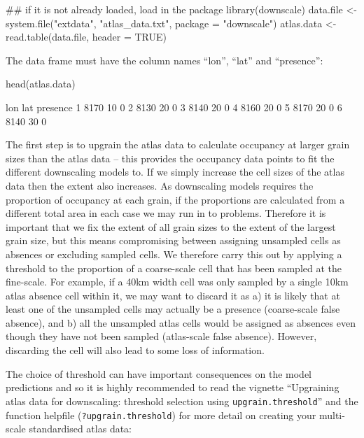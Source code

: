 \documentclass{article}[12pt, a4paper]
\begin{document}
\begin{Schunk}
\begin{Sinput}
## if it is not already loaded, load in the package
library(downscale)
data.file <- system.file("extdata", "atlas_data.txt", package = "downscale")
atlas.data <- read.table(data.file, header = TRUE)
\end{Sinput}
\end{Schunk}

The data frame must have the column names “lon”, “lat” and “presence”:

\begin{Schunk}
\begin{Sinput}
head(atlas.data)
\end{Sinput}
\begin{Soutput}
   lon lat presence
1 8170  10        0
2 8130  20        0
3 8140  20        0
4 8160  20        0
5 8170  20        0
6 8140  30        0
\end{Soutput}
\end{Schunk}

The first step is to upgrain the atlas data to calculate occupancy at larger grain sizes than the atlas data – this provides the occupancy data points to fit the different downscaling models to. If we simply increase the cell sizes of the atlas data then the extent also increases. As downscaling models requires the proportion of occupancy at each grain, if the proportions are calculated from a different total area in each case we may run in to problems. Therefore it is important that we fix the extent of all grain sizes to the extent of the largest grain size, but this means compromising between assigning unsampled cells as absences or excluding sampled cells. We therefore carry this out by applying a threshold to the proportion of a coarse-scale cell that has been sampled at the fine-scale. For example, if a 40km width cell was only sampled by a single 10km atlas absence cell within it, we may want to discard it as a) it is likely that at least one of the unsampled cells may actually be a presence (coarse-scale false absence), and b) all the unsampled atlas cells would be assigned as absences even though they have not been sampled (atlas-scale false absence). However, discarding the cell will also lead to some loss of information.

The choice of threshold can have important consequences on the model predictions and so it is highly recommended to read the vignette “Upgraining atlas data for downscaling: threshold selection using \texttt{upgrain.threshold}” and the function helpfile (\texttt{?upgrain.threshold}) for more detail on creating your multi-scale standardised atlas data:
\end{document}
